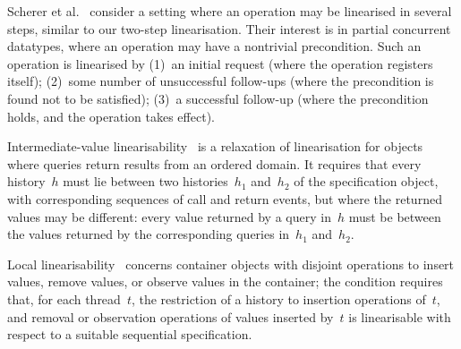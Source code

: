 Scherer et al.~\cite{SLS-2009} consider a setting where an operation may be
linearised in several steps, similar to our two-step linearisation.  Their
interest is in partial concurrent datatypes, where an operation may have a
nontrivial precondition.  Such an operation is linearised by (1)~an initial
request (where the operation registers itself); (2)~some number of
unsuccessful follow-ups (where the precondition is found not to be satisfied);
(3)~a successful follow-up (where the precondition holds, and the operation
takes effect).

Intermediate-value linearisability~\cite{IV-lin} is a relaxation of
linearisation for objects where queries return results from an ordered domain.
It requires that every history~$h$ must lie between two histories~$h_1$
and~$h_2$ of the specification object, with corresponding sequences of call
and return events, but where the returned values may be different: every value
returned by a query in~$h$ must be between the values returned by the
corresponding queries in~$h_1$ and~$h_2$.


Local linearisability~\cite{local-lin} concerns container objects with
disjoint operations to insert values, remove values, or observe values in the
container; the condition requires that, for each thread~$t$, the restriction
of a history to insertion operations of~$t$, and removal or observation
operations of values inserted by~$t$ is linearisable with respect to a
suitable sequential specification.





